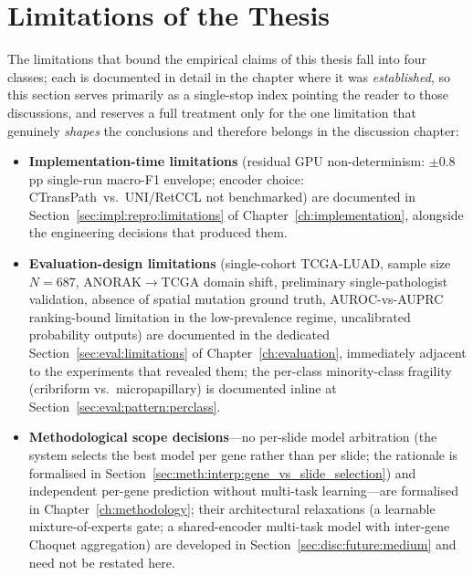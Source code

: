 \section{Limitations of the Thesis}
\label{sec:disc:limitations}

The limitations that bound the empirical claims of this thesis
fall into four classes; each is documented in detail in the
chapter where it was \emph{established}, so this section serves
primarily as a single-stop index pointing the reader to those
discussions, and reserves a full treatment only for the one
limitation that genuinely \emph{shapes} the conclusions and
therefore belongs in the discussion chapter:

\begin{itemize}
    \item \textbf{Implementation-time limitations} (residual GPU
    non-determinism: $\pm 0.8$\,pp single-run macro-F1 envelope;
    encoder choice: CTransPath~vs.\ UNI/RetCCL not benchmarked)
    are documented in
    Section~\ref{sec:impl:repro:limitations} of
    Chapter~\ref{ch:implementation}, alongside the engineering
    decisions that produced them.
    \item \textbf{Evaluation-design limitations} (single-cohort
    TCGA-LUAD, sample size $N=687$, ANORAK$\to$TCGA domain shift,
    preliminary single-pathologist validation, absence of spatial
    mutation ground truth, AUROC-vs-AUPRC ranking-bound limitation
    in the low-prevalence regime, uncalibrated probability
    outputs) are documented in the dedicated
    Section~\ref{sec:eval:limitations} of
    Chapter~\ref{ch:evaluation}, immediately adjacent to the
    experiments that revealed them; the per-class minority-class
    fragility (cribriform vs.\ micropapillary) is documented
    inline at Section~\ref{sec:eval:pattern:perclass}.
    \item \textbf{Methodological scope decisions}---no per-slide
    model arbitration (the system selects the best model per
    gene rather than per slide; the rationale is formalised in
    Section~\ref{sec:meth:interp:gene_vs_slide_selection}) and
    independent per-gene prediction without multi-task
    learning---are formalised in
    Chapter~\ref{ch:methodology}; their architectural relaxations
    (a learnable mixture-of-experts gate; a shared-encoder
    multi-task model with inter-gene Choquet aggregation) are
    developed in
    Section~\ref{sec:disc:future:medium} and need not be restated
    here.
\end{itemize}

